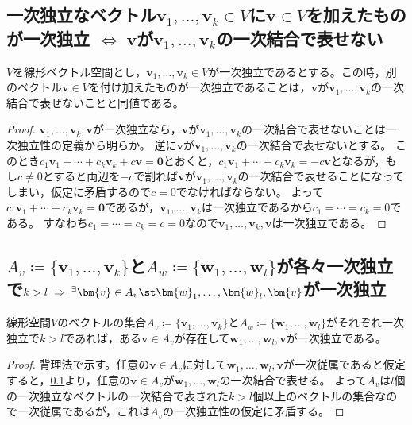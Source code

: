         \subsection{一次独立なベクトル\texorpdfstring{$\bm{v}_1,\dotsc,\bm{v}_k\in V$}{v1,...,vk ∈ V}に\texorpdfstring{$\bm{v}\in V$}{v∈V}を加えたものが一次独立 \texorpdfstring{$\iff\;\bm{v}$}{⇔ v}が\texorpdfstring{$\bm{v}_1,\dotsc,\bm{v}_k$}{v1,...,vk}の一次結合で表せない}
            \label{subsec:一次独立なベクトルの，独立集合族としての性質}
            \begin{shadebox}
                $V$を線形ベクトル空間とし，$\bm{v}_1,\dotsc,\bm{v}_k\in V$が一次独立であるとする。この時，別のベクトル$\bm{v}\in V$を付け加えたものが一次独立であることは，$\bm{v}$が$\bm{v}_1,\dotsc,\bm{v}_k$の一次結合で表せないことと同値である。
            \end{shadebox}
            \begin{proof}
                \quad\par
                $\bm{v}_1,\dotsc,\bm{v}_k,\bm{v}$が一次独立なら，$\bm{v}$が$\bm{v}_1,\dotsc,\bm{v}_k$の一次結合で表せないことは一次独立性の定義から明らか。
                逆に$\bm{v}$が$\bm{v}_1,\dotsc,\bm{v}_k$の一次結合で表せないとする。
                このとき$c_1\bm{v}_1 + \dotsb + c_k\bm{v}_k + c\bm{v} = \bm{0}$とおくと，$c_1\bm{v}_1 + \dotsb + c_k\bm{v}_k = -c\bm{v}$となるが，もし$c\neq 0$とすると両辺を$-c$で割れば$\bm{v}$が$\bm{v}_1,\dotsc,\bm{v}_k$の一次結合で表せることになってしまい，仮定に矛盾するので$c=0$でなければならない。
                よって$c_1\bm{v}_1 + \dotsb + c_k\bm{v}_k = \bm{0}$であるが，$\bm{v}_1,\dotsc,\bm{v}_k$は一次独立であるから$c_1=\dotsb=c_k=0$である。
                すなわち$c_1=\dotsb=c_k=c=0$なので$\bm{v}_1,\dotsc,\bm{v}_k,\bm{v}$は一次独立である。
            \end{proof}
        \subsection{\texorpdfstring{$A_v\coloneq\{\bm{v}_1,\dotsc,\bm{v}_k\}$}{Av := \{v1,...,vk\}}と\texorpdfstring{$A_w\coloneq\{\bm{w}_1,\dotsc,\bm{w}_l\}$}{Aw := \{w1,...,wl\}}が各々一次独立で\texorpdfstring{$k>l\; \Rightarrow\; ^\exists\bm{v}\in A_v \st \bm{w}_1,\dotsc,\bm{w}_l,\bm{v}$}{k>k ⇒ ∃v∈Av s.t. w1,...,wl,v}が一次独立}
            \begin{shadebox}
                線形空間$V$のベクトルの集合$A_v\coloneq\{\bm{v}_1,\dotsc,\bm{v}_k\}$と$A_w\coloneq\{\bm{w}_1,\dotsc,\bm{w}_l\}$がそれぞれ一次独立で$k>l$であれば，ある$\bm{v}\in A_v$が存在して$\bm{w}_1,\dotsc,\bm{w}_l,\bm{v}$が一次独立である。
            \end{shadebox}
            \begin{proof}
                \quad\par
                背理法で示す。任意の$\bm{v}\in A_v$に対して$\bm{w}_1,\dotsc,\bm{w}_l,\bm{v}$が一次従属であると仮定すると，\ref{subsec:一次独立なベクトルの，独立集合族としての性質}より，任意の$\bm{v}\in A_v$が$\bm{w}_1,\dotsc,\bm{w}_l$の一次結合で表せる。
                よって$A_v$は$l$個の一次独立なベクトルの一次結合で表された$k>l$個以上のベクトルの集合なので一次従属であるが，これは$A_v$の一次独立性の仮定に矛盾する。
            \end{proof}
